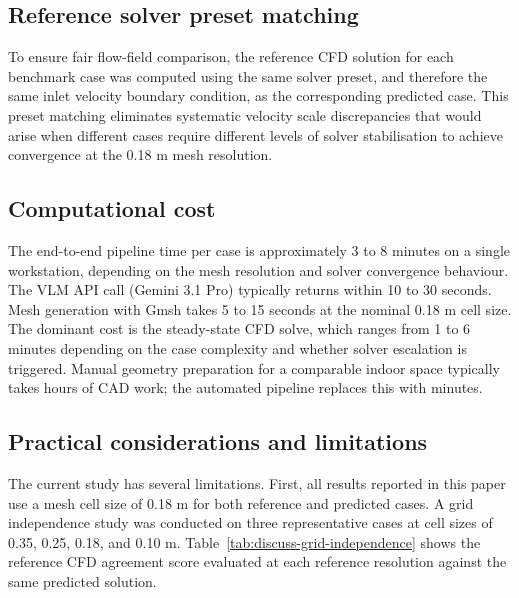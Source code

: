 \documentclass[preprint,12pt,number]{elsarticle}
\begin{document}
\subsection{Reference solver preset matching}
\label{sec:reference-solver-preset-matching}


To ensure fair flow-field comparison, the reference CFD solution for each benchmark case was computed using the same solver preset, and therefore the same inlet velocity boundary condition, as the corresponding predicted case. This preset matching eliminates systematic velocity scale discrepancies that would arise when different cases require different levels of solver stabilisation to achieve convergence at the 0.18 m mesh resolution.

\subsection{Computational cost}
\label{sec:computational-cost}


The end-to-end pipeline time per case is approximately 3 to 8 minutes on a single workstation, depending on the mesh resolution and solver convergence behaviour. The VLM API call (Gemini 3.1 Pro) typically returns within 10 to 30 seconds. Mesh generation with Gmsh takes 5 to 15 seconds at the nominal 0.18 m cell size. The dominant cost is the steady-state CFD solve, which ranges from 1 to 6 minutes depending on the case complexity and whether solver escalation is triggered. Manual geometry preparation for a comparable indoor space typically takes hours of CAD work; the automated pipeline replaces this with minutes.

\subsection{Practical considerations and limitations}
\label{sec:practical-considerations-and-limitations}


The current study has several limitations. First, all results reported in this paper use a mesh cell size of 0.18 m for both reference and predicted cases. A grid independence study was conducted on three representative cases at cell sizes of 0.35, 0.25, 0.18, and 0.10 m. Table~\ref{tab:discuss-grid-independence} shows the reference CFD agreement score evaluated at each reference resolution against the same predicted solution.
\end{document}
